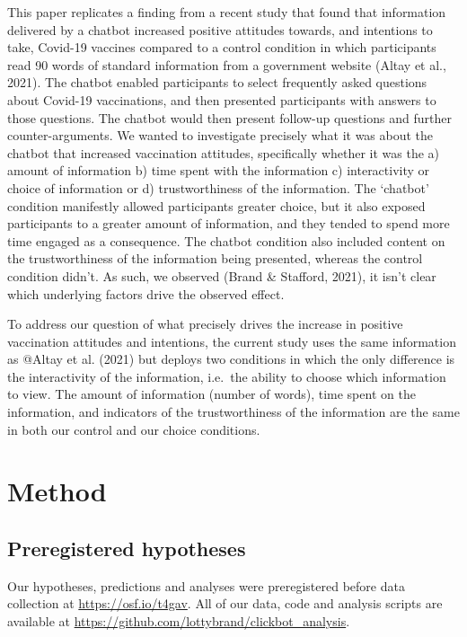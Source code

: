 \documentclass[
  english,
  ,jou,floatsintext]{apa6}
\begin{document}
This paper replicates a finding from a recent study that found that information delivered by a chatbot increased positive attitudes towards, and intentions to take, Covid-19 vaccines compared to a control condition in which participants read 90 words of standard information from a government website (Altay et al., 2021). The chatbot enabled participants to select frequently asked questions about Covid-19 vaccinations, and then presented participants with answers to those questions. The chatbot would then present follow-up questions and further counter-arguments. We wanted to investigate precisely what it was about the chatbot that increased vaccination attitudes, specifically whether it was the a) amount of information b) time spent with the information c) interactivity or choice of information or d) trustworthiness of the information. The `chatbot' condition manifestly allowed participants greater choice, but it also exposed participants to a greater amount of information, and they tended to spend more time engaged as a consequence. The chatbot condition also included content on the trustworthiness of the information being presented, whereas the control condition didn't. As such, we observed (Brand \& Stafford, 2021), it isn't clear which underlying factors drive the observed effect.

To address our question of what precisely drives the increase in positive vaccination attitudes and intentions, the current study uses the same information as @Altay et al. (2021) but deploys two conditions in which the only difference is the interactivity of the information, i.e.~the ability to choose which information to view. The amount of information (number of words), time spent on the information, and indicators of the trustworthiness of the information are the same in both our control and our choice conditions.

\hypertarget{method}{%
\section{Method}\label{method}}

\hypertarget{preregistered-hypotheses}{%
\subsection{Preregistered hypotheses}\label{preregistered-hypotheses}}

Our hypotheses, predictions and analyses were preregistered before data collection at \url{https://osf.io/t4gav}. All of our data, code and analysis scripts are available at \url{https://github.com/lottybrand/clickbot_analysis}.
\end{document}
